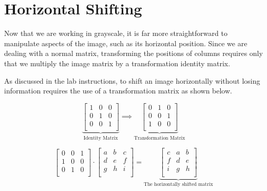 \section{Horizontal Shifting}

Now that we are working in grayscale, it is far more straightforward to manipulate aspects of the image, such as its horizontal position. Since we are dealing with a normal matrix, transforming the positions of columns requires only that we multiply the image matrix by a transformation identity matrix.

As discussed in the lab instructions, to shift an image horizontally without losing information requires the use of a transformation matrix as shown below.

    \[
      \underbrace{
        \begin{bmatrix}
          1&0&0\\
          0&1&0\\
          0&0&1\\
        \end{bmatrix}
      }_{\text{Identity Matrix}}
      \implies
      \underbrace{
        \begin{bmatrix}
          0&1&0\\
          0&0&1\\
          1&0&0\\
        \end{bmatrix}
      }_{\text{Transformation Matrix}}
    \]

    \[
      \begin{bmatrix}
        0&0&1\\
        1&0&0\\
        0&1&0\\
      \end{bmatrix}
      \cdot
      \begin{bmatrix}
        a&b&c\\
        d&e&f\\
        g&h&i\\
      \end{bmatrix}
      =
      \underbrace{
        \begin{bmatrix}
          c&a&b\\
          f&d&e\\
          i&g&h\\
        \end{bmatrix}
      }_{\text{The horizontally shifted matrix}}
    \]

